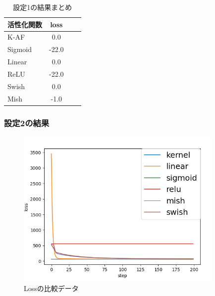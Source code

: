 \begin{table}[htbp]
    \begin{center}
        \caption{設定1の結果まとめ}
        \vspace{2mm} 
        \begin{tabular}{l*{2}{c}r}
            活性化関数              & loss \\
            \hline
            K-AF            & 0.0 \\
            Sigmoid            & -22.0 \\
            Linear            & 0.0 \\
            ReLU        & -22.0 \\
            Swish           & 0.0 \\
            Mish           & -1.0 \\
    
        \end{tabular}
    \end{center}
\end{table}

\subsubsection{設定2の結果}

\begin{figure}[hbtp]
    \begin{center}
        \includegraphics[width=10cm]{asset/boston_0000001_SGDkaiming_normal__non_200.png}
            \caption{Lossの比較データ}
            \label{boston}
    \end{center}
\end{figure}



